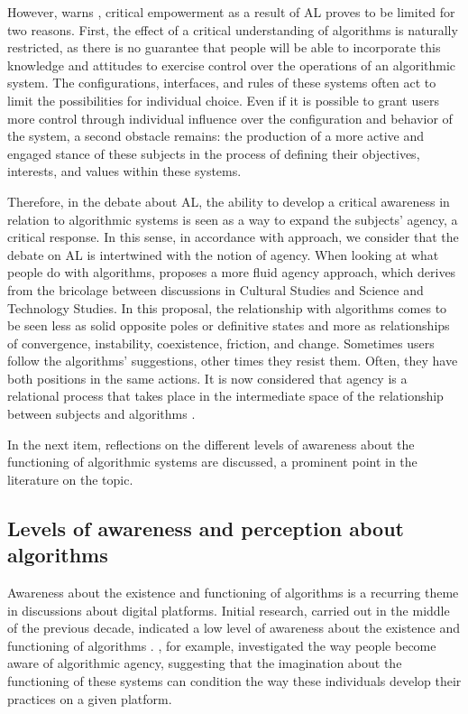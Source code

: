However, warns \textcite{Konig2022}, critical empowerment as a result of AL proves to be limited for two reasons. First, the effect of a critical understanding of algorithms is naturally restricted, as there is no guarantee that people will be able to incorporate this knowledge and attitudes to exercise control over the operations of an algorithmic system. The configurations, interfaces, and rules of these systems often act to limit the possibilities for individual choice. Even if it is possible to grant users more control through individual influence over the configuration and behavior of the system, a second obstacle remains: the production of a more active and engaged stance of these subjects in the process of defining their objectives, interests, and values within these systems.

Therefore, in the debate about AL, the ability to develop a critical awareness in relation to algorithmic systems is seen as a way to expand the subjects' agency, a critical response. In this sense, in accordance with  approach, we consider that the debate on AL is intertwined with the notion of agency. When looking at what people do with algorithms, \textcite{Siles2024} proposes a more fluid agency approach, which derives from the bricolage between discussions in Cultural Studies and Science and Technology Studies. In this proposal, the relationship with algorithms comes to be seen less as solid opposite poles or definitive states and more as relationships of convergence, instability, coexistence, friction, and change. Sometimes users follow the algorithms' suggestions, other times they resist them. Often, they have both positions in the same actions. It is now considered that agency is a relational process that takes place in the intermediate space of the relationship between subjects and algorithms \cite{Siles2024}.

In the next item, reflections on the different levels of awareness about the functioning of algorithmic systems are discussed, a prominent point in the literature on the topic.

\subsection{Levels of awareness and perception about algorithms}

Awareness about the existence and functioning of algorithms is a recurring theme in discussions about digital platforms. Initial research, carried out in the middle of the previous decade, indicated a low level of awareness about the existence and functioning of algorithms \cite{Eslami2015}. \textcite{Bucher2019}, for example, investigated the way people become aware of algorithmic agency, suggesting that the imagination about the functioning of these systems can condition the way these individuals develop their practices on a given platform.

